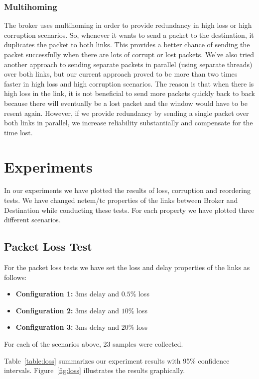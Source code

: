 \documentclass[conference]{IEEEtran}
\begin{document}
\subsubsection{Multihoming}
The broker uses multihoming in order to provide redundancy in high loss or high
corruption scenarios. So, whenever it wants to send a packet to the destination,
it duplicates the packet to both links. This provides a better chance of sending
the packet successfully when there are lots of corrupt or lost packets. We've also
tried another approach to sending separate packets in parallel (using separate threads)
over both links, but our current approach proved to be more than two times faster
in high loss and high corruption scenarios.
The reason is that when there is high loss in the link, it is not beneficial to
send more packets quickly back to back because there will eventually be a lost packet and
the window would have to be resent again. However, if we provide redundancy by sending a
single packet over both links in parallel, we increase reliability substantially and compensate for the time lost.

\section{Experiments}

In our experiments we have plotted the results of loss, corruption and reordering tests. We have changed netem/tc properties of the links between Broker and Destination while conducting these tests.
For each property we have plotted three different scenarios.

\subsection{Packet Loss Test}\label{AA}

For the packet loss tests we have set the loss and delay properties of the links as follows:
\begin{itemize}
    \item \textbf{Configuration 1:} 3ms delay and $0.5\%$ loss
    \item \textbf{Configuration 2:} 3ms delay and $10\%$ loss
    \item \textbf{Configuration 3:} 3ms delay and $20\%$ loss
\end{itemize}
For each of the scenarios above, 23 samples were collected.

Table~\ref{table:loss} summarizes our experiment results with 95\% confidence intervals.
Figure~\ref{fig:loss} illustrates the results graphically. 
\end{document}
